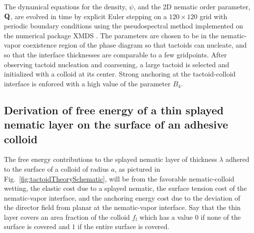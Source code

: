 \documentclass[%
 aip,
 amsmath,amssymb,
 reprint,%
]{revtex4-1}
\begin{document}
The dynamical equations for the density, $\psi$, and the 2D nematic order parameter, ${\bf Q}$, are evolved in time by explicit Euler stepping on a $120 \times 120$ grid with periodic boundary conditions using the pseudospectral method implemented on the numerical package XMDS \cite{XMDS}. The parameters are chosen to be in the nematic-vapor coexistence region of the phase diagram so that tactoids can nucleate, and so that the interface thicknesses are comparable to a few gridpoints. After observing tactoid nucleation and coarsening, a large tactoid is selected and initialized with a colloid at its center. Strong anchoring at the tactoid-colloid interface is enforced with a high value of the parameter $B_4$.



\subsection{Derivation of free energy of a thin splayed nematic layer on the surface of an adhesive colloid} \label{ss:tactoidWettingLayerFEDerivation}
The free energy contributions to the splayed nematic layer of thickness $\lambda$ adhered to the surface of a colloid of radius $a$, as pictured in Fig.~\ref{fig:tactoidTheorySchematic}, will be from the favorable nematic-colloid wetting, the elastic cost due to a splayed nematic, the surface tension cost of the nematic-vapor interface, and the anchoring energy cost due to the deviation of the director field from planar at the nematic-vapor interface. Say that the thin layer covers an area fraction of the colloid $f_l$ which has a value $0$ if none of the surface is covered and $1$ if the entire surface is covered.
\end{document}
